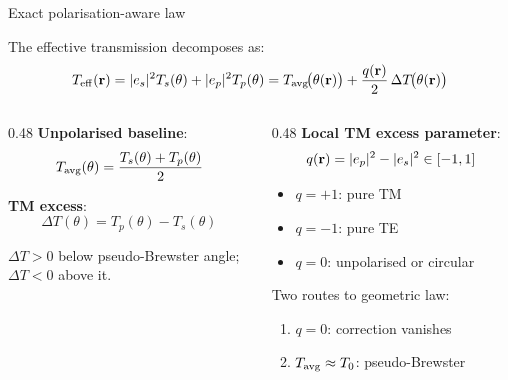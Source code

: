\begin{frame}[label=app-p1-exact]{Exact polarisation-aware law}

  The effective transmission decomposes as:
  \[
    T_{\mathrm{eff}}(\mathbf{r}) = |e_s|^2 T_s(\theta) + |e_p|^2 T_p(\theta)
    = T_{\mathrm{avg}}\!\bigl(\theta(\mathbf{r})\bigr) + \frac{q(\mathbf{r})}{2}\,\Delta T\!\bigl(\theta(\mathbf{r})\bigr)
  \]

  \vspace{2pt}
  \begin{columns}[T]
    \begin{column}{0.48\textwidth}
      \textbf{Unpolarised baseline}:
      \[
        T_{\mathrm{avg}}(\theta) = \frac{T_s(\theta) + T_p(\theta)}{2}
      \]

      \textbf{TM excess}:
      \[
        \Delta T(\theta) = T_p(\theta) - T_s(\theta)
      \]

      $\Delta T > 0$ below pseudo-Brewster angle;\\
      $\Delta T < 0$ above it.
    \end{column}

    \begin{column}{0.48\textwidth}
      \textbf{Local TM excess parameter}:
      \[
        q(\mathbf{r}) = |e_p|^2 - |e_s|^2 \in [-1, 1]
      \]

      \begin{itemize}
        \item $q = +1$: pure TM
        \item $q = -1$: pure TE
        \item $q = 0$: unpolarised or circular
      \end{itemize}

      \vspace{4pt}
      Two routes to geometric law:
      \begin{enumerate}
        \item $q = 0$: correction vanishes
        \item $T_{\mathrm{avg}} \approx T_0$: pseudo-Brewster
      \end{enumerate}
    \end{column}
  \end{columns}

  \vspace{2pt}
  \quad{}
\end{frame}

